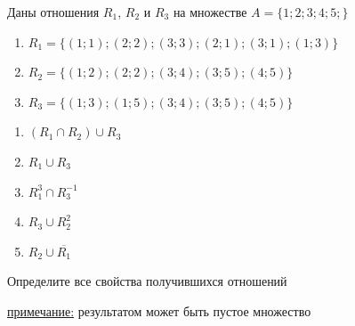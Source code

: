 \question
Даны отношения $R_1$, $R_2$ и $R_3$ на множестве $A = \{1; 2; 3; 4; 5;\}$ 
\begin{enumerate}
	\renewcommand{\labelenumi}{\alph{enumi})}
	\item $R_1 = \{(1; 1); (2; 2); (3; 3); (2; 1);  (3; 1); (1; 3)\}$
	\item $R_2 = \{(1; 2); (2; 2); (3; 4); (3; 5); (4; 5)\}$
	\item $R_3 = \{(1; 3); (1; 5); (3; 4); (3; 5); (4; 5)\}$
\end{enumerate}

\begin{enumerate}
	\renewcommand{\labelenumi}{\alph{enumi})}
	\item $(R_1 \cap R_2) \cup R_3$
	\item $R_1 \cup R_3$
	\item $R_1^3 \cap R_3^{-1}$
	\item $R_3 \cup R_2^2$
	\item $R_2 \cup \overline{R_1}$
\end{enumerate}

Определите все свойства получившихся отношений

\underline{примечание:} результатом может быть пустое множество